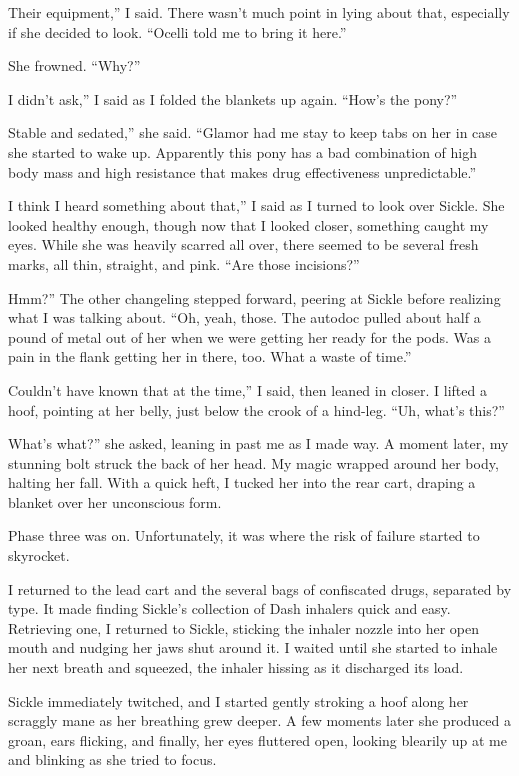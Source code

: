 \leavevmode{}Their equipment,” I said. There wasn’t much point in lying about that, especially if she decided to look. “Ocelli told me to bring it here.”

She frowned. “Why?”

\leavevmode{}I didn’t ask,” I said as I folded the blankets up again. “How’s the pony?”

\leavevmode{}Stable and sedated,” she said. “Glamor had me stay to keep tabs on her in case she started to wake up. Apparently this pony has a bad combination of high body mass and high resistance that makes drug effectiveness unpredictable.”

\leavevmode{}I think I heard something about that,” I said as I turned to look over Sickle. She looked healthy enough, though now that I looked closer, something caught my eyes. While she was heavily scarred all over, there seemed to be several fresh marks, all thin, straight, and pink. “Are those incisions?”

\leavevmode{}Hmm?” The other changeling stepped forward, peering at Sickle before realizing what I was talking about. “Oh, yeah, those. The autodoc pulled about half a pound of metal out of her when we were getting her ready for the pods. Was a pain in the flank getting her in there, too. What a waste of time.”

\leavevmode{}Couldn’t have known that at the time,” I said, then leaned in closer. I lifted a hoof, pointing at her belly, just below the crook of a hind-leg. “Uh, what’s this?”

\leavevmode{}What’s what?” she asked, leaning in past me as I made way. A moment later, my stunning bolt struck the back of her head. My magic wrapped around her body, halting her fall. With a quick heft, I tucked her into the rear cart, draping a blanket over her unconscious form.

Phase three was on. Unfortunately, it was where the risk of failure started to skyrocket.

I returned to the lead cart and the several bags of confiscated drugs, separated by type. It made finding Sickle’s collection of Dash inhalers quick and easy. Retrieving one, I returned to Sickle, sticking the inhaler nozzle into her open mouth and nudging her jaws shut around it. I waited until she started to inhale her next breath and squeezed, the inhaler hissing as it discharged its load.

Sickle immediately twitched, and I started gently stroking a hoof along her scraggly mane as her breathing grew deeper. A few moments later she produced a groan, ears flicking, and finally, her eyes fluttered open, looking blearily up at me and blinking as she tried to focus.

